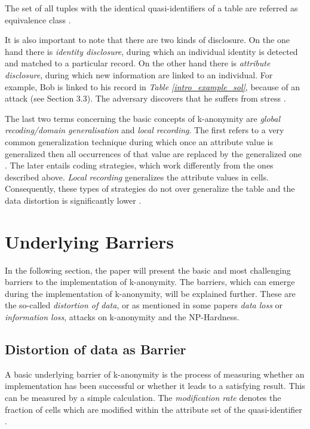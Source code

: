 \documentclass{llncs}
\begin{document}
The set of all tuples with the identical quasi-identifiers of a table are referred as equivalence class \cite{li2006achieving}.

It is also important to note that there are two kinds of disclosure. On the one hand there is \textit{ identity disclosure}, during which an individual identity is detected and matched to a particular record. On the other hand there is \textit{attribute disclosure}, during which new information are linked to an individual. For example, Bob is linked to his record in \textit{Table \ref{intro_example_sol}}, because of an attack (see Section 3.3). The adversary discovers that he suffers from stress \cite{sweeney2002k}.

The last two terms concerning the basic concepts of k-anonymity are \textit{global recoding/domain generalisation} and \textit{local recording}. The first refers to a very common generalization technique during which once an attribute value is generalized then all occurrences of that value are replaced by the generalized one  \cite{sweeney2002k,sweeney2002achieving,li2006achieving,incognito}. The later entails coding strategies, which work differently from the ones described above. \textit{Local recording} generalizes the attribute values in cells. Consequently, these types of strategies do not over generalize the table and the data distortion is significantly lower \cite{li2006achieving}. 
\newpage
\section{Underlying Barriers}

In the following section, the paper will present the basic and most challenging barriers to the implementation of k-anonymity. The barriers, which can emerge during the implementation of k-anonymity, will be explained further. These are the so-called \textit{distortion of data}, or as mentioned in some papers \textit{data loss} or \textit{information loss}, attacks on k-anonymity and the NP-Hardness. 
\subsection{Distortion of data as Barrier} \label{sec:Distortion of data as Barrier}

A basic underlying barrier of k-anonymity is the process of measuring whether an implementation has been successful or whether it leads to a satisfying result. This can be measured by a simple calculation. The \textit{modification rate} denotes the fraction of cells which are modified within the attribute set of the quasi-identifier \cite{li2006achieving}.
\end{document}
